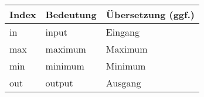 \begin{table}[htbp]
    \centering
        \begin{tabular}{lll}
            \toprule
            Index                  & Bedeutung              & Übersetzung (ggf.) \\
            \midrule
            in                     & input                  & Eingang \\
            max                    & maximum                & Maximum \\
            min                    & minimum                & Minimum \\
            out                    & output                 & Ausgang \\
            \bottomrule
        \end{tabular}
\end{table}